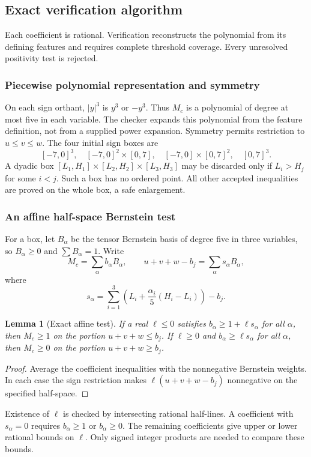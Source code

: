 \documentclass[11pt,a4paper]{article}
\numberwithin{equation}{section}
\newtheorem{lemma}[theorem]{Lemma}
\theoremstyle{definition}
\theoremstyle{remark}
\begin{document}
\subsection{Exact verification algorithm}\label{n3:sec:check}
Each coefficient is rational. Verification reconstructs the polynomial from its defining features and requires complete threshold coverage. Every unresolved positivity test is rejected.

\subsubsection{Piecewise polynomial representation and symmetry}
On each sign orthant, $|y|^3$ is $y^3$ or $-y^3$. Thus $M_c$ is a polynomial
of degree at most five in each variable. The checker expands this polynomial
from the feature definition, not from a supplied power expansion. Symmetry
permits restriction to $u\le v\le w$. The four initial sign boxes are
\[
 [-7,0]^3,\quad[-7,0]^2\times[0,7],\quad
 [-7,0]\times[0,7]^2,\quad[0,7]^3.
\]
A dyadic box $[L_1,H_1]\times[L_2,H_2]\times[L_3,H_3]$ may be discarded
only if $L_i>H_j$ for some $i<j$. Such a box has no ordered point. All other
accepted inequalities are proved on the whole box, a safe enlargement.

\subsubsection{An affine half-space Bernstein test}
For a box, let $B_\alpha$ be the tensor Bernstein basis of degree five in
three variables, so $B_\alpha\ge0$ and $\sum B_\alpha=1$. Write
\[
 M_c=\sum_\alpha b_\alpha B_\alpha,\qquad
 u+v+w-b_j=\sum_\alpha s_\alpha B_\alpha,
\]
where
\[
 s_\alpha=\sum_{i=1}^3\left(L_i+\frac{\alpha_i}{5}(H_i-L_i)\right)-b_j.
\]
\begin{lemma}[Exact affine test]\label{n3:lem:affine}
If a real $\ell\le0$ satisfies $b_\alpha\ge1+\ell s_\alpha$ for all
$\alpha$, then $M_c\ge1$ on the portion $u+v+w\le b_j$.
If $\ell\ge0$ and $b_\alpha\ge\ell s_\alpha$ for all $\alpha$, then
$M_c\ge0$ on the portion $u+v+w\ge b_j$.
\end{lemma}
\begin{proof}
Average the coefficient inequalities with the nonnegative Bernstein weights.
In each case the sign restriction makes $\ell(u+v+w-b_j)$ nonnegative
on the specified half-space.
\end{proof}
Existence of $\ell$ is checked by intersecting rational half-lines. A
coefficient with $s_\alpha=0$ requires $b_\alpha\ge1$ or $b_\alpha\ge0$.
The remaining coefficients give upper or lower rational bounds on $\ell$.
Only signed integer products are needed to compare these bounds.
\end{document}
